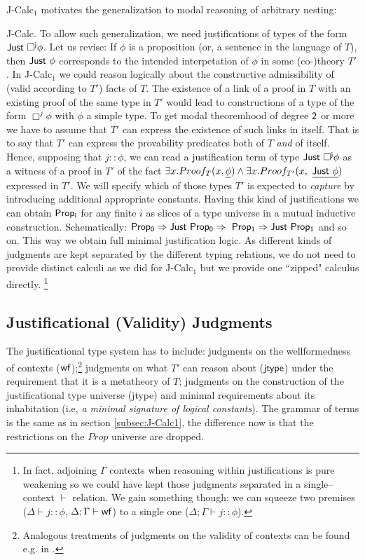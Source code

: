 \documentclass[11pt]{entcs}
\begin{document}
{\sf J-Calc$_1$} motivates the generalization to modal reasoning of arbitrary nesting: {{\sf J-Calc}. To allow such generalization, we need justifications of types of the form ${\sf Just\  \Box^{j}\phi}$. Let us revise: If $\phi$ is a proposition (or, a sentence in the language of $T$), then ${\sf Just\ \phi}$ corresponds to the intended interpetation of $\phi$ in some (co-)theory $T'$. In {\sf J-Calc$_1$} we could reason logically about the constructive admissibility of (valid according to $T'$) facts of $T$. The existence of a link of a proof in $T$ with an existing proof of the same type in $T'$ would lead to constructions of a type of the form $\Box^{j}\phi$ with $\phi$ a simple type. To get modal theoremhood of degree ${\sf 2}$ or more we have to assume that $T'$ can express the existence of such links in itself. That is to say that $T'$ can express the provability predicates both of $T$ \textit{and} of itself. Hence, supposing that $j::\phi$, we can read a justification term of type ${{\sf Just}\  \Box^{\sf j}\phi}$ as a witness of a proof in $T'$ of the fact $\exists x. Proof_T(x, \underline{\phi}) \wedge \exists x. Proof_{T'}(x, \  \underline{{\sf Just\  \phi}}) $ expressed in $T'$. 
We will specify which of those types $T'$ is expected to \textit{capture} by introducing additional appropriate constants. Having this kind of justifications we can obtain ${\sf Prop_i}$ for any finite $i$ as slices of a type universe in a mutual inductive construction. Schematically: $ {\sf Prop_0\Rightarrow Just \ Prop_0\Rightarrow \ Prop_1 \Rightarrow Just\ Prop_1}$ and so on. This way we obtain full minimal  justification logic. As different kinds of judgments are kept separated by the different typing relations, we do not need to provide distinct calculi as we did for {\sf J-Calc$_1$} but we provide one ``zipped" calculus directly. \footnote {In fact, adjoining $\Gamma$ contexts when reasoning within justifications is pure weakening so we could have kept those judgments separated in a single--context $\vdash$ relation. We gain something though: we can squeeze two premises ($\Delta\vdash j::\phi$, $\Delta;\Gamma\vdash{\sf wf}$) to a single one ($\Delta;\Gamma\vdash j::\phi$).}

\subsection{Justificational (Validity) Judgments}
\label{sec:propjtype1}
The justificational type system has to include: judgments on the wellformedness of contexts ({$\sf wf$});\footnote{ Analogous treatments of judgments on the validity of contexts can be found e.g. in \cite{Norell08dependentlytyped}.} judgments on what $T'$  can reason about ($\sf jtype$)  under the requirement that it is a metatheory of $T$; judgments on the construction of the justificational type universe ({\sf jtype}) and minimal requirements about its inhabitation (i.e, \textit{a  minimal signature of  logical constants}). The grammar of terms is the same as in section \ref{subsec:J-Calc1}, the difference now is that the restrictions on the $Prop$ universe are dropped. 

}
\end{document}
